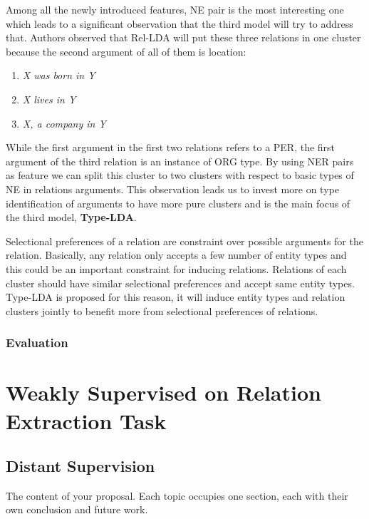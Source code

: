 \documentclass[12pt]{report}
\begin{document}
 Among all the newly introduced features, NE pair is the most interesting one which leads to a 
 significant observation that the third model will try to address that. Authors observed that 
 Rel-LDA will put these three relations in one cluster because the second argument of all of them is location:
 
 \begin{enumerate}
   \item \emph{ X was born in Y}
   \item \emph{ X lives in Y}
   \item \emph{ X, a company in Y}
 \end{enumerate}
 
 While the first argument in the first two relations refers to a PER, the first argument of the 
 third relation is an instance of ORG type. By using NER pairs as feature we can split this cluster 
 to two clusters with respect to basic types of NE in relations arguments. 
 This observation leads us to invest more on type identification of arguments to have more pure 
 clusters and is the main focus of the third model, \textbf{Type-LDA}.
 
 
 Selectional preferences of a relation are constraint over possible arguments for the relation.
  Basically, any relation only accepts a few number of entity types and this could be an important constraint
   for inducing relations. Relations of each cluster should have similar selectional preferences and
    accept same entity types. Type-LDA is proposed for this reason, it will induce entity types 
    and relation clusters jointly to benefit more from selectional preferences of relations.
     
 

\subsection {Evaluation}
\label{ch:evaluation}

\chapter{Weakly Supervised on Relation Extraction Task}
\label{ch:related}

\section{Distant Supervision}
\label{ch:weakly supervised}

The content of \cite{Huang2012} your proposal. Each topic occupies one section, each
with their own conclusion and future work.
\end{document}
